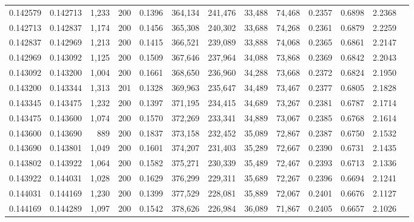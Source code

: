 \begin{tabular}{rrrrrrrrrrrrr}
0.142579 & 0.142713 &  1,233 & 200 &                                     0.1396 & 364,134 & 241,476 &  33,488 &  74,468 & 0.2357 & 0.6898 & 2.2368 \\
0.142713 & 0.142837 &  1,174 & 200 &                                     0.1456 & 365,308 & 240,302 &  33,688 &  74,268 & 0.2361 & 0.6879 & 2.2259 \\
0.142837 & 0.142969 &  1,213 & 200 &                                     0.1415 & 366,521 & 239,089 &  33,888 &  74,068 & 0.2365 & 0.6861 & 2.2147 \\
0.142969 & 0.143092 &  1,125 & 200 &                                     0.1509 & 367,646 & 237,964 &  34,088 &  73,868 & 0.2369 & 0.6842 & 2.2043 \\
0.143092 & 0.143200 &  1,004 & 200 &                                     0.1661 & 368,650 & 236,960 &  34,288 &  73,668 & 0.2372 & 0.6824 & 2.1950 \\
0.143200 & 0.143344 &  1,313 & 201 &                                     0.1328 & 369,963 & 235,647 &  34,489 &  73,467 & 0.2377 & 0.6805 & 2.1828 \\
0.143345 & 0.143475 &  1,232 & 200 &                                     0.1397 & 371,195 & 234,415 &  34,689 &  73,267 & 0.2381 & 0.6787 & 2.1714 \\
0.143475 & 0.143600 &  1,074 & 200 &                                     0.1570 & 372,269 & 233,341 &  34,889 &  73,067 & 0.2385 & 0.6768 & 2.1614 \\
0.143600 & 0.143690 &    889 & 200 &                                     0.1837 & 373,158 & 232,452 &  35,089 &  72,867 & 0.2387 & 0.6750 & 2.1532 \\
0.143690 & 0.143801 &  1,049 & 200 &                                     0.1601 & 374,207 & 231,403 &  35,289 &  72,667 & 0.2390 & 0.6731 & 2.1435 \\
0.143802 & 0.143922 &  1,064 & 200 &                                     0.1582 & 375,271 & 230,339 &  35,489 &  72,467 & 0.2393 & 0.6713 & 2.1336 \\
0.143922 & 0.144031 &  1,028 & 200 &                                     0.1629 & 376,299 & 229,311 &  35,689 &  72,267 & 0.2396 & 0.6694 & 2.1241 \\
0.144031 & 0.144169 &  1,230 & 200 &                                     0.1399 & 377,529 & 228,081 &  35,889 &  72,067 & 0.2401 & 0.6676 & 2.1127 \\
0.144169 & 0.144289 &  1,097 & 200 &                                     0.1542 & 378,626 & 226,984 &  36,089 &  71,867 & 0.2405 & 0.6657 & 2.1026 \\

\end{tabular}
